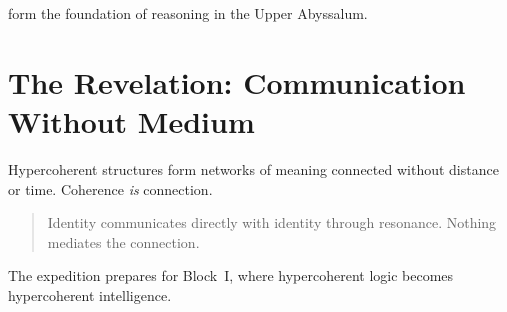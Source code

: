 form the foundation of reasoning in the Upper Abyssalum.

\section{The Revelation: Communication Without Medium}
Hypercoherent structures form networks of meaning connected without distance or time.
Coherence \emph{is} connection.

\begin{quote}
Identity communicates directly with identity through resonance.  
Nothing mediates the connection.
\end{quote}

The expedition prepares for Block~I, where hypercoherent logic becomes hypercoherent intelligence.
